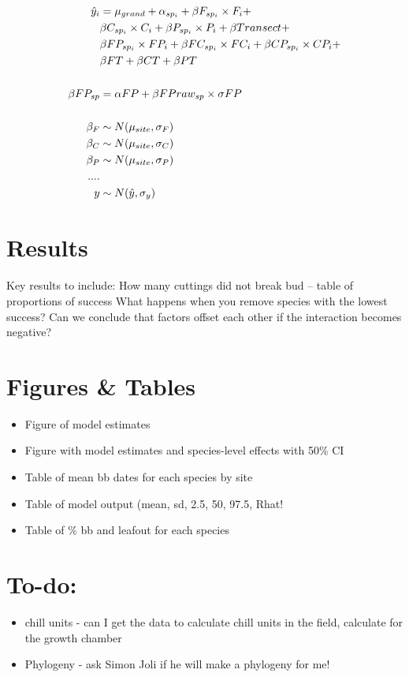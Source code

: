 \documentclass[11pt,letter]{article}
\begin{document}
\begin{align*}
\hat{y}_i &=  \mu_{grand} + \alpha_{sp_i} + \beta F_{sp_i} \times F_i + \\
& \beta C_{sp_i}  \times C_i + \beta P_{sp_i}  \times P_i + \beta Transect  + \\
& \beta FP_{sp_i}  \times FP_i  + \beta FC_{sp_i}  \times FC_i + \beta CP_{sp_i}  \times CP_i + \\
& \beta FT + \beta CT  + \beta PT  \\
\vspace{1ex}\\
\beta FP_{sp} &= \alpha FP + \beta FPraw_{sp}  \times \sigma FP\\
\vspace{1ex}\\
\beta_{F} & \sim N(\mu_{site}, \sigma_{F}) \\
\beta_{C} & \sim N(\mu_{site}, \sigma_{C}) \\
\beta_{P} & \sim N(\mu_{site}, \sigma_{P}) \\
....\\
y & \sim N(\hat{y}, \sigma_{y}) \\
\end{align*}


\section{Results}

Key results to include:
How many cuttings did not break bud -- table of proportions of success
What happens when you remove species with the lowest success?
Can we conclude that factors offset each other if the interaction becomes negative?

\section{Figures \& Tables}

\begin{itemize}
\item Figure of model estimates
\item Figure with model estimates and species-level effects with 50\% CI
\item Table of mean bb dates for each species by site
\item Table of model output (mean, sd, 2.5, 50, 97.5, Rhat! 
\item Table of \% bb and leafout for each species
\end{itemize}

\section{To-do:}
\begin{itemize}
\item chill units - can I get the data to calculate chill units in the field, calculate for the growth chamber
\item Phylogeny - ask Simon Joli if he will make a phylogeny for me!
\end{itemize}
\end{document}
